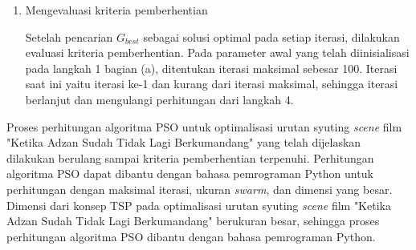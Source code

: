 {{\begin{enumerate}[align = left, left = 0cm, nolistsep]
\begin{enumerate}[label = (\alph*), align = left, left = 0cm, nolistsep]
                        {\footnotesize
                        \begin{equation*}
                            \begin{aligned}
                                \text{biaya syuting } & = f(G_{best}^{1})\cdot(\operatorname{max}(\text{biaya \textit{scene}})+\operatorname{min}(\text{biaya \textit{scene}})) + \operatorname{min}(\text{biaya \textit{scene}}) \\
                                                      & = 19.73353\cdot (\text{Rp}580.109,48-\text{Rp}0) + \text{Rp}0                                                                                                             \\
                                                      & = \text{Rp} 11.447.607,82686
                            \end{aligned}
                        \end{equation*}
                        }

                        Setelah diubah indeks \textit{scene} pada rute $G_{best}^{1}$ agar didapatkan urutan syuting \textit{scene}  yaitu:
                        4-21B-22C-19-31-32B-1C-17-25-12B-15-16D-7A-26-11-20 \newline
                        -29B-22B-34-23B-29A-1D-32A-23A-2A-19B-33B-2B-30A-37-9A-27- \newline
                        35A-33A-13-14B-1E-3-21A-36-30B-6A-12A-35B-5-22A-34B-18-16B-\newline
                        30C-16A-10-6B-24-28-14A-8-9B-16C-7B-4

              \end{enumerate}

        \item Mengevaluasi kriteria pemberhentian \par \nobreak
              Setelah pencarian $G_{best}$ sebagai solusi optimal pada setiap iterasi, dilakukan evaluasi kriteria pemberhentian.
              Pada parameter awal yang telah diinisialisasi pada langkah 1 bagian (a), ditentukan iterasi maksimal sebesar 100.
              Iterasi saat ini yaitu iterasi ke-1 dan kurang dari iterasi maksimal, sehingga iterasi berlanjut dan mengulangi perhitungan dari langkah 4.
    \end{enumerate}

    Proses perhitungan algoritma PSO untuk optimalisasi urutan syuting \textit{scene}  film "Ketika Adzan Sudah Tidak Lagi Berkumandang" yang telah dijelaskan dilakukan berulang sampai kriteria pemberhentian terpenuhi.
    Perhitungan algoritma PSO dapat dibantu dengan bahasa pemrograman Python untuk perhitungan dengan maksimal iterasi, ukuran \textit{swarm}, dan dimensi yang besar.
    Dimensi dari konsep TSP pada optimalisasi urutan syuting \textit{scene}  film "Ketika Adzan Sudah Tidak Lagi Berkumandang" berukuran besar, sehingga proses perhitungan algoritma PSO dibantu dengan bahasa pemrograman Python.

}}
